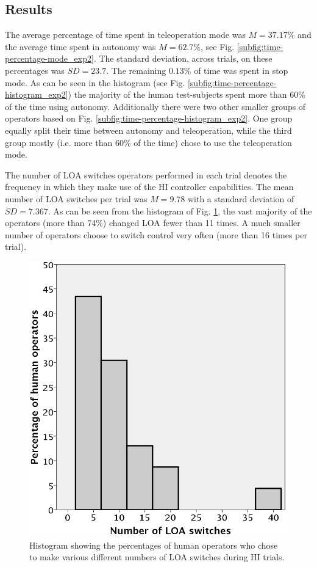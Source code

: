 \documentclass[a4paper,12pt,oneside,openright]{bhamthesis}
\begin{document}
\subsection{Results}
\label{chapter4:results_HRI}
The average percentage of time spent in teleoperation mode was \textit{$M = 37.17\%$} and the average time spent in autonomy was \textit{$M = 62.7\%$}, see Fig. \ref{subfig:time-percentage-mode_exp2}. The standard deviation, across trials, on these percentages was $SD = 23.7$. The remaining $0.13\%$ of time was spent in stop mode. As can be seen in the histogram (see Fig. \ref{subfig:time-percentage-histogram_exp2}) the majority of the human test-subjects spent more than 60\% of the time using autonomy. Additionally there were two other smaller groups of operators based on Fig. \ref{subfig:time-percentage-histogram_exp2}. One group equally split their time between autonomy and teleoperation, while the third group mostly (i.e. more than 60\% of the time) chose to use the teleoperation mode.

The number of LOA switches operators performed in each trial denotes the frequency in which they make use of the HI controller capabilities. The mean number of LOA switches per trial was  $M = 9.78$ with a standard deviation of $SD = 7.367$. As can be seen from the histogram of Fig. \ref{fig:number-loa-switches_exp2}, the vast majority of the operators (more than 74\%) changed LOA fewer than 11 times. A much smaller number of operators choose to switch control very often (more than 16 times per trial).


\begin{figure}
	\centering
	\includegraphics[width=0.49\columnwidth]{chapter4_fig/number-loa-switches.png}
	\caption{Histogram showing the percentages of human operators who chose to make various different numbers of LOA switches during HI trials.} 
	\label{fig:number-loa-switches_exp2}
\end{figure}
\end{document}

